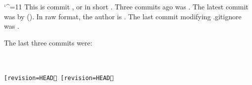 \catcode`^=11
This is commit \gitcommithash[shortHash=false], or in short \gitcommithash.
Three commits ago was \gitcommithash[revision=HEAD^^^].
The latest commit was by \gitcommitauthorname{} (\gitcommitauthoremail).
In raw format, the author is \texttt{\gitcommitauthor}.
The last commit modifying .gitignore was \gitcommithash[file=.gitignore].

The last three commits were:

{\tt\small
	\gitcommithash{}                \gitcommitmsg                \\
	\gitcommithash[revision=HEAD^]  \gitcommitmsg[revision=HEAD^]\\
	\gitcommithash[revision=HEAD^^] \gitcommitmsg[revision=HEAD^^]}
